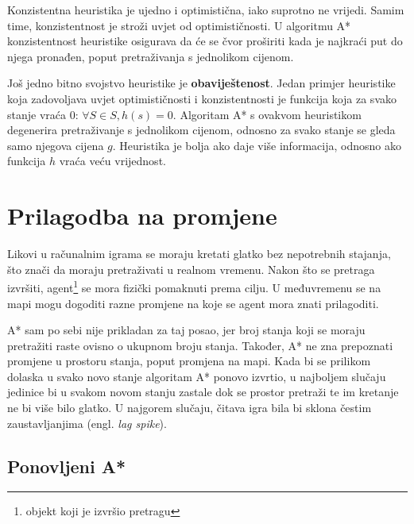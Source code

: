 \documentclass[times, utf8, zavrsni, numeric]{fer}
\begin{document}
\par Konzistentna heuristika je ujedno i optimistična, iako suprotno ne vrijedi. 
Samim time, konzistentnost je stroži uvjet od optimističnosti. 
U algoritmu A* konzistentnost heuristike osigurava da će se čvor proširiti kada je najkraći put do njega pronađen, poput pretraživanja s jednolikom cijenom.

\par Još jedno bitno svojstvo heuristike je \textbf{obaviještenost}. 
Jedan primjer heuristike koja zadovoljava uvjet optimističnosti i konzistentnosti je funkcija koja za svako stanje vraća 0: \(\forall S \in S, h(s) = 0\). 
Algoritam A* s ovakvom heuristikom degenerira pretraživanje s jednolikom cijenom, odnosno za svako stanje se gleda samo njegova cijena \(g\). 
Heuristika je bolja ako daje više informacija, odnosno ako funkcija \(h\) vraća veću vrijednost.

\section{Prilagodba na promjene}\label{sec:adaptation}

\par Likovi u računalnim igrama se moraju kretati glatko bez nepotrebnih stajanja, što znači da moraju pretraživati u realnom vremenu.
Nakon što se pretraga izvršiti, agent\footnote{objekt koji je izvršio pretragu} se mora fizički pomaknuti prema cilju.
U međuvremenu se na mapi mogu dogoditi razne promjene na koje se agent mora znati prilagoditi.

\par A* sam po sebi nije prikladan za taj posao, jer broj stanja koji se moraju pretražiti raste ovisno o ukupnom broju stanja. 
Također, A* ne zna prepoznati promjene u prostoru stanja, poput promjena na mapi. Kada bi se prilikom dolaska u svako novo stanje algoritam A* ponovo izvrtio, u najboljem slučaju jedinice bi u svakom novom stanju zastale dok se prostor pretraži te im kretanje ne bi više bilo glatko. 
U najgorem slučaju, čitava igra bila bi sklona čestim zaustavljanjima (engl. \textit{lag spike}).

\subsection{Ponovljeni A*}
\end{document}
